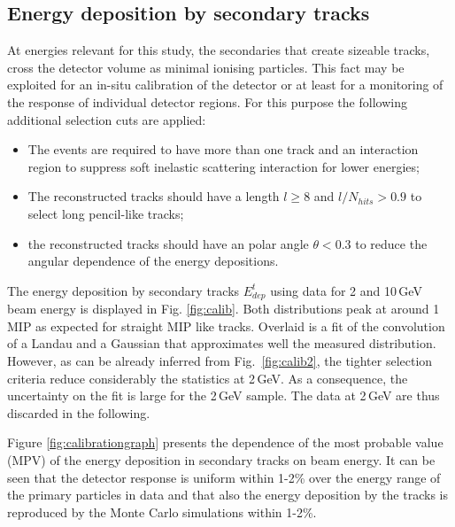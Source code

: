 \subsection{Energy deposition by secondary tracks}

At energies relevant for this study, the secondaries that create sizeable tracks, cross the detector volume as minimal ionising particles. 
This fact may be exploited for an in-situ calibration of the detector or at least for a monitoring of the response of individual detector regions. For this purpose the following additional selection cuts are applied: 
\begin{itemize}
	\item The events are required to have more than one track and an interaction region to suppress soft inelastic scattering interaction for lower energies;
	\item The reconstructed tracks should have a length $l\geq 8$ and $l / N_{hits} > 0.9$ to select long pencil-like tracks;
	\item the reconstructed tracks should have an polar angle $\theta < 0.3$ to reduce the angular dependence of the energy depositions.
\end{itemize}

The energy deposition by secondary tracks $E_{dep}^t$ using data for 2 and 10\,GeV beam energy is displayed in Fig. \ref{fig:calib}. Both distributions peak at around 1\,MIP as expected for straight MIP like tracks. Overlaid is a fit of the convolution of a Landau and a Gaussian that approximates well the measured distribution. However, as can be already inferred from Fig.~\ref{fig:calib2}, the tighter selection criteria reduce considerably the statistics at 2\,GeV. As a consequence, the uncertainty on the fit is large for the 2\,GeV sample. The data at 2\,GeV are thus discarded in the following.

Figure \ref{fig:calibrationgraph} presents the dependence of the most probable value (MPV) of the energy deposition in secondary tracks on beam energy. 
It can be seen that the detector response is uniform within 1-2\% over the energy range of the primary particles in data and that also the energy deposition by the tracks is reproduced by the Monte Carlo simulations within 1-2\%.  

